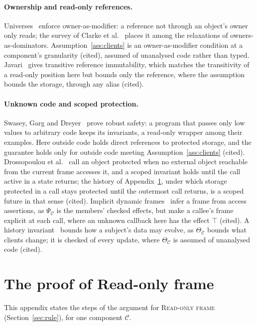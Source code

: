 \documentclass[10pt,a4paper]{article}
\theoremstyle{definition}
\theoremstyle{remark}
\newcommand{\cC}{\mathcal{C}}
\begin{document}
\paragraph{Ownership and read-only references.} Universes~\cite{universes}
enforce owner-as-modifier: a reference not through an object's owner only
reads; the survey of Clarke et al.~\cite{ownsurvey} places it among the
relaxations of owners-as-dominators. Assumption~\ref{ass:clients} is an
owner-as-modifier condition at a component's granularity (cited), assumed
of unanalysed code rather than typed. Javari~\cite{javari} gives
transitive reference immutability, which matches the transitivity of a
read-only position here but bounds only the reference, where the
assumption bounds the storage, through any alias (cited).

\paragraph{Unknown code and scoped protection.} Swasey, Garg and
Dreyer~\cite{ocpl} prove robust safety: a program that passes only low
values to arbitrary code keeps its invariants, a read-only wrapper among
their examples. Here outside code holds direct references to protected
storage, and the guarantee holds only for outside code meeting
Assumption~\ref{ass:clients} (cited). Drossopoulou et al.~\cite{external}
call an object protected when no external object reachable from the
current frame accesses it, and a scoped invariant holds until the call
active in a state returns; the history of Appendix~\ref{app:ro}, under
which storage protected in a call stays protected until the outermost
call returns, is a scoped future in that sense (cited). Implicit dynamic
frames~\cite{idf} infer a frame from access assertions, as $\Psi_\cC$ is
the members' checked effects, but make a callee's frame explicit at each
call, where an unknown callback here has the effect $\top$ (cited). A
history invariant~\cite{history} bounds how a subject's data may evolve,
as $\Theta_\cC$ bounds what clients change; it is checked of every
update, where $\Theta_\cC$ is assumed of unanalysed code (cited).


\appendix
\section{The proof of Read-only frame}\label{app:ro}

This appendix states the steps of the argument for \textsc{Read-only
frame} (Section~\ref{sec:rule}), for one component $\cC$.
\end{document}
